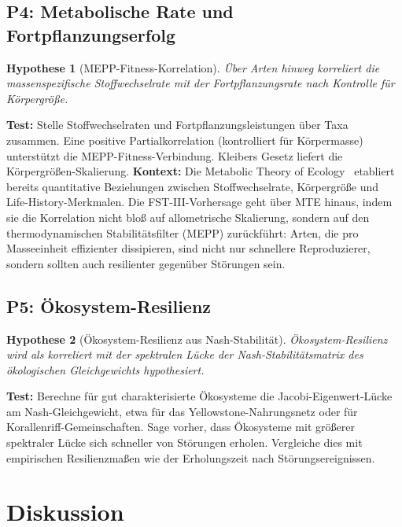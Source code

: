 \documentclass[12pt,a4paper]{article}
\newtheorem{hypothesis}{Hypothese}
\theoremstyle{remark}
\begin{document}
\subsection{P4: Metabolische Rate und Fortpflanzungserfolg}

\begin{hypothesis}[MEPP-Fitness-Korrelation]
Über Arten hinweg korreliert die massenspezifische Stoffwechselrate mit der Fortpflanzungsrate nach Kontrolle für Körpergröße.
\end{hypothesis}

\textbf{Test:} Stelle Stoffwechselraten und Fortpflanzungsleistungen über Taxa zusammen. Eine positive Partialkorrelation (kontrolliert für Körpermasse) unterstützt die MEPP-Fitness-Verbindung. Kleibers Gesetz liefert die Körpergrößen-Skalierung. \textbf{Kontext:} Die Metabolic Theory of Ecology~\citep{BrownMTE2004} etabliert bereits quantitative Beziehungen zwischen Stoffwechselrate, Körpergröße und Life-History-Merkmalen. Die FST-III-Vorhersage geht über MTE hinaus, indem sie die Korrelation nicht bloß auf allometrische Skalierung, sondern auf den thermodynamischen Stabilitätsfilter (MEPP) zurückführt: Arten, die pro Masseeinheit effizienter dissipieren, sind nicht nur schnellere Reproduzierer, sondern sollten auch resilienter gegenüber Störungen sein.

\subsection{P5: Ökosystem-Resilienz}

\begin{hypothesis}[Ökosystem-Resilienz aus Nash-Stabilität]
Ökosystem-Resilienz wird als korreliert mit der spektralen Lücke der Nash-Stabilitätsmatrix des ökologischen Gleichgewichts hypothesiert.
\end{hypothesis}

\textbf{Test:} Berechne für gut charakterisierte Ökosysteme die Jacobi-Eigenwert-Lücke am Nash-Gleichgewicht, etwa für das Yellowstone-Nahrungsnetz oder für Korallenriff-Gemeinschaften. Sage vorher, dass Ökosysteme mit größerer spektraler Lücke sich schneller von Störungen erholen. Vergleiche dies mit empirischen Resilienzmaßen wie der Erholungszeit nach Störungsereignissen.

\section{Diskussion}
\label{sec:discussion}
\end{document}
